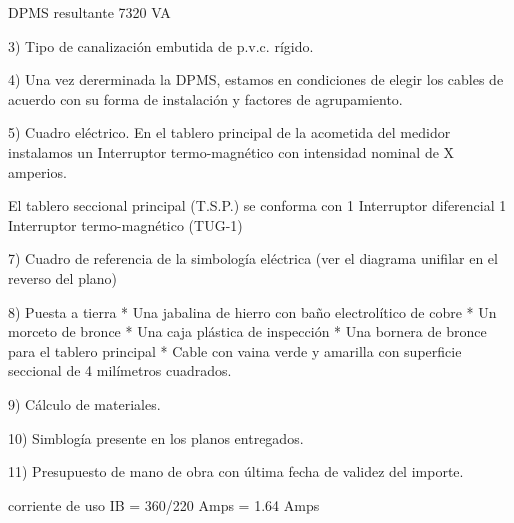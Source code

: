 DPMS resultante                            7320 VA

3) Tipo de canalización embutida de p.v.c. rígido.

4) Una vez dererminada la DPMS, estamos en condiciones de elegir los cables de acuerdo
con su forma de instalación y factores de agrupamiento.

5) Cuadro eléctrico. 
En el tablero principal de la acometida del medidor instalamos un
Interruptor termo-magnético con intensidad nominal de X amperios.

El tablero seccional principal (T.S.P.) se conforma con
1 Interruptor diferencial
1 Interruptor termo-magnético (TUG-1)

7) Cuadro de referencia de la simbología eléctrica (ver el diagrama unifilar en el reverso del plano)

8) Puesta a tierra
* Una jabalina de hierro con baño electrolítico de cobre
* Un morceto de bronce
* Una caja plástica de inspección
* Una bornera de bronce para el tablero principal
* Cable con vaina verde y amarilla con superficie seccional de 4 milímetros cuadrados.

9) Cálculo de materiales.

10) Simblogía presente en los planos entregados.

11) Presupuesto de mano de obra con última fecha de validez del importe.






corriente de uso IB = 360/220 Amps = 1.64 Amps



